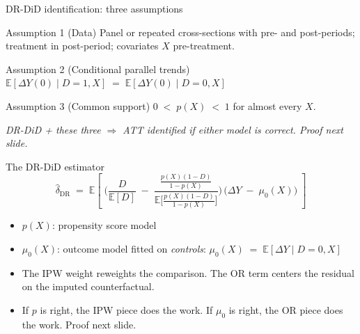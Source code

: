 \documentclass[aspectratio=169,11pt]{beamer}
\begin{document}
\begin{frame}{DR-DiD identification: three assumptions}
\footnotesize
\begin{block}{Assumption 1 (Data)}
Panel or repeated cross-sections with pre- and post-periods; treatment in post-period; covariates $X$ pre-treatment.
\end{block}
\begin{block}{Assumption 2 (Conditional parallel trends)}
\centering
$\mathbb{E}[\Delta Y(0) \mid D{=}1, X] \;=\; \mathbb{E}[\Delta Y(0) \mid D{=}0, X]$
\end{block}
\begin{block}{Assumption 3 (Common support)}
\centering
$0 \;<\; p(X) \;<\; 1$ \;for almost every $X$.
\end{block}
\begin{center}
\itshape\color{warmgray}
DR-DiD + these three $\Rightarrow$ ATT identified if either model is correct. Proof next slide.
\end{center}
\end{frame}

\begin{frame}{The DR-DiD estimator}
\vspace{0.4em}
\small
\[
\widehat{\delta}_{\text{DR}} \;=\; \mathbb{E}\!\left[\;
\Bigg(\frac{D}{\mathbb{E}[D]} \;-\; \frac{\frac{p(X)(1-D)}{1-p(X)}}{\mathbb{E}\!\big[\frac{p(X)(1-D)}{1-p(X)}\big]}\Bigg)\,\big(\Delta Y \;-\; \mu_0(X)\big)
\;\right]
\]
\vspace{0.3em}
\begin{itemize}\small
  \item $p(X)$: propensity score model
  \item $\mu_0(X)$: outcome model fitted on \textit{controls}: \;\;$\mu_0(X) \;=\; \mathbb{E}[\Delta Y \mid D{=}0, X]$
  \item The IPW weight reweights the comparison. The OR term centers the residual on the imputed counterfactual.
  \item If $p$ is right, the IPW piece does the work. If $\mu_0$ is right, the OR piece does the work. Proof next slide.
\end{itemize}
\end{frame}
\end{document}
